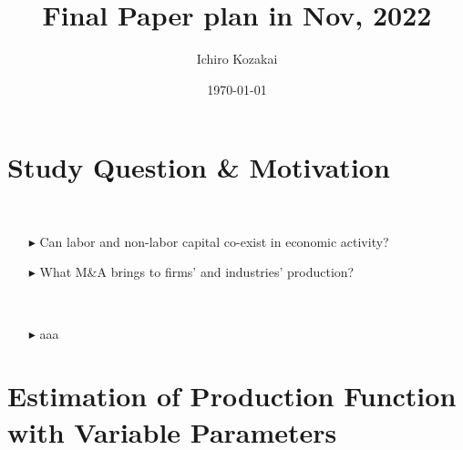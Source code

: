 \documentclass[aspectratio=169, dvipdfmx, 11pt]{beamer}
\title[Final Paper Plan]{Final Paper plan in Nov, 2022}
\author{Ichiro Kozakai}
\date{\today}
\begin{document}
\begin{frame}
    \titlepage
\end{frame}

\begin{frame}
    \tableofcontents
\end{frame}


\section{Study Question \& Motivation}
\begin{frame}
    \begin{description}
        \setlength{\itemsep}{0.3in}
        \item[My Study Question]\mbox{}\\
        \begin{itemize}
            \setlength{\itemsep}{0.1in}
            \setlength{\itemindent}{-15mm}
            \item[$\blacktriangleright$] Can labor and non-labor capital co-exist in economic activity?
            \item[$\blacktriangleright$] What M\&A brings to firms' and industries' production?
        \end{itemize}
        \item[Study Background] \mbox{}\\
            \begin{itemize}
                \setlength{\itemsep}{0.1in}
                \setlength{\itemindent}{-15mm}
                \item[$\blacktriangleright$] aaa
            \end{itemize}
    \end{description}
\end{frame}

\section[Production Function]{Estimation of Production Function with Variable Parameters}
\end{document}
